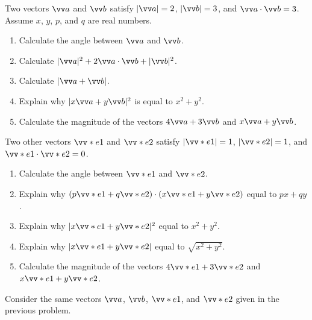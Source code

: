 \documentclass[11pt,pdfa,lastpage]{MishoNote}
\begin{document}
\begin{problems}
  \Problem[S] \relax\relax\label{q:ipbasic}%
  Two vectors $\vc a$ and $\vc b$ satisfy $|\vc a|=2$, $|\vc b|=3$, and $\vc a\cdot\vc b=3$. Assume $x$, $y$, $p$, and $q$ are real numbers.
  \begin{enumerate}
    \item Calculate the angle between $\vc a$ and $\vc b$.
    \item Calculate $|\vc a|^2+2\vc a\cdot\vc b+|\vc b|^2$.
    \item Calculate $|\vc a+\vc b|$.
    \item Explain why $|x\vc a+y\vc b|^2$ is  equal to $x^2+y^2$.
    \item Calculate the magnitude of the vectors $4\vc a+3\vc b$ and $x\vc a+y\vc b$.
   \end{enumerate}
  Two other vectors $\vc e_1$ and $\vc e_2$ satisfy $|\vc e_1|=1$, $|\vc e_2|=1$, and $\vc e_1\cdot\vc e_2=0$.
  \begin{enumerate}[resume]
    \item Calculate the angle between $\vc e_1$ and $\vc e_2$.
    \item Explain why $(p\vc e_1+q\vc e_2)\cdot(x\vc e_1+y\vc e_2)$  equal to $px+qy$.
    \item Explain why $|x\vc e_1+y\vc e_2|^2$  equal to $x^2+y^2$.
    \item Explain why $|x\vc e_1+y\vc e_2|$  equal to $\sqrt{x^2+y^2}$.
    \item Calculate the magnitude of the vectors $4\vc e_1+3\vc e_2$ and $x\vc e_1+y\vc e_2$.
   \end{enumerate}
  \Problem[A] Consider the same vectors $\vc a$, $\vc b$, $\vc e_1$, and $\vc e_2$ given in the previous problem.


\end{problems}
\end{document}
